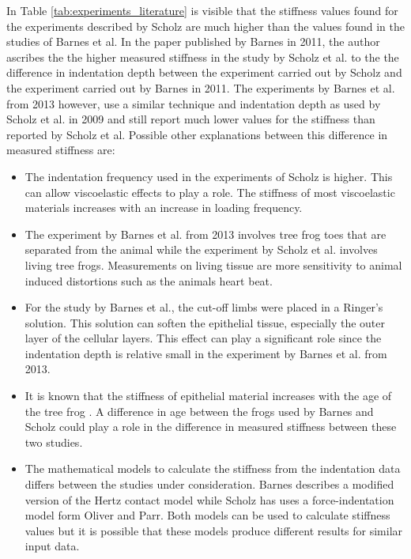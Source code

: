 \qquad In Table \ref{tab:experiments_literature} is visible that the stiffness values found for the experiments described by Scholz are much higher than the values found in the studies of Barnes et al. In the paper published by Barnes in 2011, the author ascribes the the higher measured stiffness in the study by Scholz et al. to the the difference in indentation depth between the experiment carried out by Scholz and the experiment carried out by Barnes in 2011. The experiments by Barnes et al. from 2013 however, use a similar technique and indentation depth as used by Scholz et al. in 2009 and still report much lower values for the stiffness than reported by Scholz et al. Possible other explanations between this difference in measured stiffness are:
 \begin{itemize}
     \item The indentation frequency used in the experiments of Scholz is higher. This can allow viscoelastic effects to play a role. The stiffness of most viscoelastic materials increases with an increase in loading frequency. 
     \item The experiment by Barnes et al. from 2013 involves tree frog toes that are separated from the animal while the experiment by Scholz et al. involves living tree frogs. Measurements on living tissue are more sensitivity to animal induced distortions such as the animals heart beat. 
     \item For the study by Barnes et al., the cut-off limbs were placed in a Ringer's solution. This solution can soften the epithelial tissue, especially the outer layer of the cellular layers. This effect can play a significant role since the indentation depth is relative small in the experiment by Barnes et al. from 2013. 
     \item It is known that the stiffness of epithelial material increases with the age of the tree frog \cite{barnes2011elastic}. A difference in age between the frogs used by Barnes and Scholz could play a role in the difference in measured stiffness between these two studies. 
     \item The mathematical models to calculate the stiffness from the indentation data differs between the studies under consideration. Barnes describes a modified version of the Hertz contact model while Scholz has uses a force-indentation model form Oliver and Parr. Both models can be used to calculate stiffness values but it is possible that these models produce different results for similar input data. 
 \end{itemize}
 
